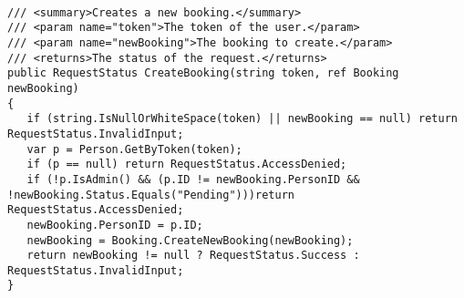 \begin{lstlisting}[caption=Service kode til oprettelse af booking]

/// <summary>Creates a new booking.</summary>
/// <param name="token">The token of the user.</param>
/// <param name="newBooking">The booking to create.</param>
/// <returns>The status of the request.</returns>
public RequestStatus CreateBooking(string token, ref Booking newBooking)
{
   if (string.IsNullOrWhiteSpace(token) || newBooking == null) return RequestStatus.InvalidInput;
   var p = Person.GetByToken(token);
   if (p == null) return RequestStatus.AccessDenied;
   if (!p.IsAdmin() && (p.ID != newBooking.PersonID && !newBooking.Status.Equals("Pending")))return RequestStatus.AccessDenied;
   newBooking.PersonID = p.ID;
   newBooking = Booking.CreateNewBooking(newBooking);
   return newBooking != null ? RequestStatus.Success : RequestStatus.InvalidInput;
}
\end{lstlisting}